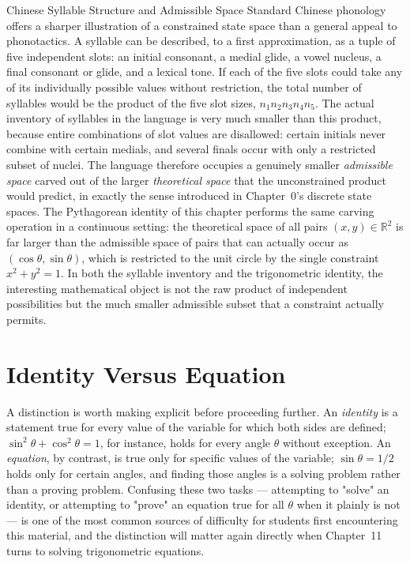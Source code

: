 \begin{sidebar}{Chinese Syllable Structure and Admissible Space}
Standard Chinese phonology offers a sharper illustration of a constrained
state space than a general appeal to phonotactics. A syllable can be
described, to a first approximation, as a tuple of five independent slots:
an initial consonant, a medial glide, a vowel nucleus, a final consonant or
glide, and a lexical tone. If each of the five slots could take any of its
individually possible values without restriction, the total number of
syllables would be the product of the five slot sizes, $n_1 n_2 n_3 n_4
n_5$. The actual inventory of syllables in the language is very much
smaller than this product, because entire combinations of slot values are
disallowed: certain initials never combine with certain medials, and
several finals occur with only a restricted subset of nuclei. The
language therefore occupies a genuinely smaller \emph{admissible space}
carved out of the larger \emph{theoretical space} that the unconstrained
product would predict, in exactly the sense introduced in Chapter~0's
discrete state spaces. The Pythagorean identity of this chapter performs
the same carving operation in a continuous setting: the theoretical space
of all pairs $(x,y) \in \mathbb{R}^2$ is far larger than the admissible
space of pairs that can actually occur as $(\cos\theta, \sin\theta)$,
which is restricted to the unit circle by the single constraint $x^2 +
y^2 = 1$. In both the syllable inventory and the trigonometric identity,
the interesting mathematical object is not the raw product of independent
possibilities but the much smaller admissible subset that a constraint
actually permits.
\end{sidebar}

\section{Identity Versus Equation}

A distinction is worth making explicit before proceeding further. An
\emph{identity} is a statement true for every value of the variable for
which both sides are defined; $\sin^2\theta + \cos^2\theta = 1$, for
instance, holds for every angle $\theta$ without exception. An
\emph{equation}, by contrast, is true only for specific values of the
variable; $\sin\theta = 1/2$ holds only for certain angles, and finding
those angles is a solving problem rather than a proving problem. Confusing
these two tasks --- attempting to "solve" an identity, or attempting to
"prove" an equation true for all $\theta$ when it plainly is not --- is one
of the most common sources of difficulty for students first encountering
this material, and the distinction will matter again directly when
Chapter~11 turns to solving trigonometric equations.

